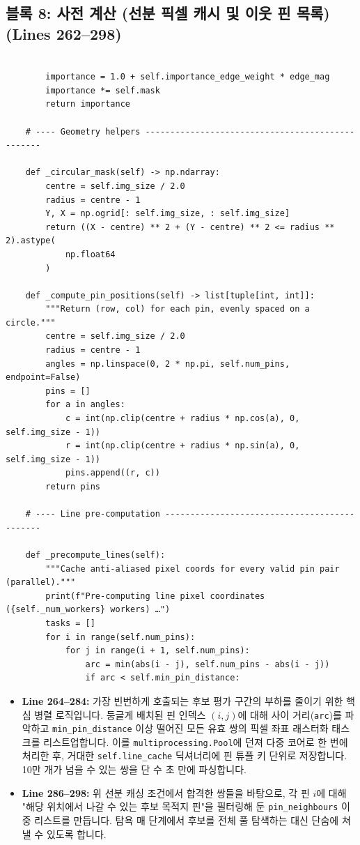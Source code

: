 \subsection*{블록 8: 사전 계산 (선분 픽셀 캐시 및 이웃 핀 목록) (Lines 262--298)}
\begin{lstlisting}[firstnumber=262]

        importance = 1.0 + self.importance_edge_weight * edge_mag
        importance *= self.mask
        return importance

    # ---- Geometry helpers -------------------------------------------------

    def _circular_mask(self) -> np.ndarray:
        centre = self.img_size / 2.0
        radius = centre - 1
        Y, X = np.ogrid[: self.img_size, : self.img_size]
        return ((X - centre) ** 2 + (Y - centre) ** 2 <= radius ** 2).astype(
            np.float64
        )

    def _compute_pin_positions(self) -> list[tuple[int, int]]:
        """Return (row, col) for each pin, evenly spaced on a circle."""
        centre = self.img_size / 2.0
        radius = centre - 1
        angles = np.linspace(0, 2 * np.pi, self.num_pins, endpoint=False)
        pins = []
        for a in angles:
            c = int(np.clip(centre + radius * np.cos(a), 0, self.img_size - 1))
            r = int(np.clip(centre + radius * np.sin(a), 0, self.img_size - 1))
            pins.append((r, c))
        return pins

    # ---- Line pre-computation ---------------------------------------------

    def _precompute_lines(self):
        """Cache anti-aliased pixel coords for every valid pin pair (parallel)."""
        print(f"Pre-computing line pixel coordinates ({self._num_workers} workers) …")
        tasks = []
        for i in range(self.num_pins):
            for j in range(i + 1, self.num_pins):
                arc = min(abs(i - j), self.num_pins - abs(i - j))
                if arc < self.min_pin_distance:
\end{lstlisting}
\begin{itemize}
\item \textbf{Line 264--284:} 가장 빈번하게 호출되는 후보 평가 구간의 부하를 줄이기 위한 핵심 병렬 로직입니다. 둥글게 배치된 핀 인덱스 \((i, j)\)에 대해 사이 거리(\texttt{arc})를 파악하고 \texttt{min\_pin\_distance} 이상 떨어진 모든 유효 쌍의 픽셀 좌표 래스터화 태스크를 리스트업합니다. 이를 \texttt{multiprocessing.Pool}에 던져 다중 코어로 한 번에 처리한 후, 거대한 \texttt{self.line\_cache} 딕셔너리에 핀 튜플 키 단위로 저장합니다. 10만 개가 넘을 수 있는 쌍을 단 수 초 만에 파싱합니다.
\item \textbf{Line 286--298:} 위 선분 캐싱 조건에서 합격한 쌍들을 바탕으로, 각 핀 \(i\)에 대해 "해당 위치에서 나갈 수 있는 후보 목적지 핀"을 필터링해 둔 \texttt{pin\_neighbours} 이중 리스트를 만듭니다. 탐욕 매 단계에서 후보를 전체 풀 탐색하는 대신 단숨에 쳐낼 수 있도록 합니다.
\end{itemize}

